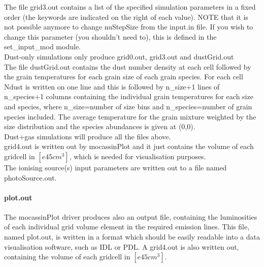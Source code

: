 \documentclass[11pt]{article}
\begin{document}
    The file grid3.out contains a list of the specified 
    simulation parameters in a fixed order (the keywords are indicated on the right 
    of each value). NOTE that it is not possible anymore to 
    change nuStepSize from the input.in file. If you wish to change this parameter 
    (you shouldn't need to), this is defined in the set\_input\_mod module.\\
    Dust-only simulations only produce grid0.out, grid3.out and dustGrid.out \\
    The file dustGrid.out contains the dust number density at each cell followed 
    by the grain temperatures for each grain size of each grain species. 
    For each cell Ndust is written on one line and this is followed by n\_size+1 
    lines of n\_species+1 columns containing the individual grain temperatures for 
    each size and species, where n\_size=number of size bins and n\_species=number 
    of grain species included. The average temperature for the grain mixture 
    weighted by the size distribution and the species abundances is given at 
    (0,0). \\
    Dust+gas simulations will produce all the files above. \\
    grid4.out is written out by mocassinPlot and it just contains the volume of each
    gridcell in $[e45 cm^3]$, which is needed for visualisation purposes.\\
    The  ionising source(s) input parameters are written out to a file named photoSource.out.\\

\paragraph{    plot.out}
    The {\sc mocassin}Plot driver produces also an output file, containing the 
    luminosities of each individual grid volume element in the required emission 
    lines. This file, named 
    plot.out, is written in a format which should be easily readable into a 
    data visualisation software, such as IDL or PDL. A grid4.out is also written out, 
    containing the volume of each gridcell in $[e45 cm^3]$.\\


\\ 
\\
\\
\end{document}
